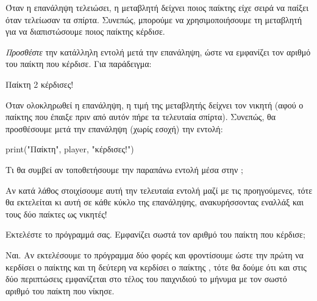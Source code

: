 \documentclass[a4paper,11pt,oneside]{book}
\begin{document}
\begin{step}
Όταν η επανάληψη τελειώσει, η μεταβλητή  δείχνει ποιος παίκτης είχε σειρά να παίξει όταν τελείωσαν τα σπίρτα. Συνεπώς, μπορούμε να χρησιμοποιήσουμε τη μεταβλητή  για να διαπιστώσουμε ποιος παίκτης κέρδισε.

\emph{Προσθέστε} την κατάλληλη εντολή μετά την επανάληψη, ώστε να εμφανίζει τον αριθμό του παίκτη που κέρδισε. Για παράδειγμα:

\marginnote[14pt]{\iconcomputer}
\begin{pyterm}
Παίκτη 2 κέρδισες!
\end{pyterm}

\begin{answer}
Όταν ολοκληρωθεί η επανάληψη, η τιμή της μεταβλητής  δείχνει τον νικητή (αφού ο παίκτης που έπαιξε πριν από αυτόν πήρε τα τελευταία σπίρτα). Συνεπώς, θα προσθέσουμε μετά την επανάληψη (χωρίς εσοχή) την εντολή:

\begin{pynew}
print("Παίκτη", player, "κέρδισες!")
\end{pynew}
\end{answer}

Τι θα συμβεί αν τοποθετήσουμε την παραπάνω εντολή μέσα στην ;

\begin{answer}
Αν κατά λάθος στοιχίσουμε αυτή την τελευταία εντολή μαζί με τις προηγούμενες, τότε θα εκτελείται κι αυτή σε κάθε κύκλο της επανάληψης, ανακυρήσσοντας εναλλάξ και τους δύο παίκτες ως νικητές!
\end{answer}

Εκτελέστε το πρόγραμμά σας. Εμφανίζει σωστά τον αριθμό του παίκτη που κέρδισε;

\begin{answer}
Ναι. Αν εκτελέσουμε το πρόγραμμα δύο φορές και φροντίσουμε ώστε την πρώτη να κερδίσει ο παίκτης  και τη δεύτερη να κερδίσει ο παίκτης , τότε θα δούμε ότι και στις δύο περιπτώσεις εμφανίζεται στο τέλος του παιχνιδιού το μήνυμα με τον σωστό αριθμό του παίκτη που νίκησε.
\end{answer}
\end{step}
\end{document}

